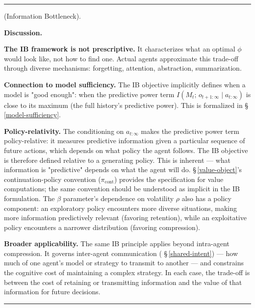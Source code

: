\documentclass[11pt,oneside]{article}
\newcounter{claim}[section]
\renewcommand{\theclaim}{\thesection.\arabic{claim}}
\newenvironment{segment}[2]{%
  \refstepcounter{claim}%
  \bigskip\noindent\hrule\smallskip
  \noindent{\bfseries #1~\theclaim}\enskip(#2).\par\smallskip
  \noindent\ignorespaces
}{%
  \par\smallskip\noindent\hrule\bigskip
}
\newenvironment{formulation}[1][]{\begin{segment}{Formulation}{#1}}{\end{segment}}
\begin{document}
\begin{formulation}[Information Bottleneck]
\medskip\noindent\textbf{Discussion.}


\textbf{The IB framework is not prescriptive.} It characterizes what an optimal $\phi$ would look like, not how to find one. Actual agents approximate this trade-off through diverse mechanisms: forgetting, attention, abstraction, summarization.

\textbf{Connection to model sufficiency.} The IB objective implicitly defines when a model is "good enough": when the predictive power term $I(M_t;\, o_{t+1:\infty} \mid a_{t:\infty})$ is close to its maximum (the full history's predictive power). This is formalized in \S\,\ref{model-sufficiency}.

\textbf{Policy-relativity.} The conditioning on $a_{t:\infty}$ makes the predictive power term policy-relative: it measures predictive information given a particular sequence of future actions, which depends on what policy the agent follows. The IB objective is therefore defined relative to a generating policy. This is inherent — what information is "predictive" depends on what the agent will do. \S\,\ref{value-object}'s continuation-policy convention ($\pi_{\text{cont}}$) provides the specification for value computations; the same convention should be understood as implicit in the IB formulation. The $\beta$ parameter's dependence on volatility $\rho$ also has a policy component: an exploratory policy encounters more diverse situations, making more information predictively relevant (favoring retention), while an exploitative policy encounters a narrower distribution (favoring compression).

\textbf{Broader applicability.} The same IB principle applies beyond intra-agent compression. It governs inter-agent communication ( \S\,\ref{shared-intent}) — how much of one agent's model or strategy to transmit to another — and constrains the cognitive cost of maintaining a complex strategy. In each case, the trade-off is between the cost of retaining or transmitting information and the value of that information for future decisions.

\end{formulation}
\end{document}
